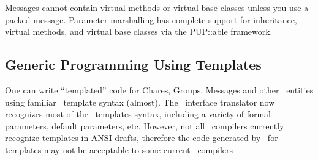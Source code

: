 Messages cannot contain virtual methods
or virtual base classes unless you use a packed message.
Parameter marshalling has complete support for inheritance, virtual
methods, and virtual base classes via the PUP::able framework.




\subsection{Generic Programming Using Templates}


One can write ``templated'' code for Chares, Groups, Messages and other
\charmpp\  entities using familiar \CC\ template syntax (almost). The \charmpp\
interface translator now recognizes most of the \CC\ templates syntax,
including a variety of formal parameters, default parameters, etc. However, not
all \CC\ compilers currently recognize templates in ANSI drafts, therefore the
code generated by \charmpp\ for templates may not be acceptable to some current
\CC\ compilers

\newcommand{\longcompilerfootnote}{\footnote{ Most modern \CC\
    compilers belong to one of the two camps. One that supports
    Borland style template instantiation, and the other that supports
    AT\&T Cfront style template instantiation. In the first, code is
    generated for the source file where the instantiation is seen.
    GNU \CC\ falls in this category.  In the second, which template is
    to be instantiated, and where the templated code is seen is noted
    in a separate area (typically a local directory), and then just
    before linking all the template instantiations are
    generated. Solaris CC 5.0 belongs to this category. For templates
    to work for compilers in the first category such as for GNU \CC\
    all the templated code needs to be visible to the compiler at the
    point of instantiation, that is, while compiling the source file
    containing the template instantiation. For a variety of reasons,
    \charmpp\ interface translator cannot generate all the templated
    code in the declarations file {\tt *.decl.h}, which is included in
    the source file where templates are instantiated. Thus, for
    \charmpp\ generated templates to work for GNU \CC\ even parts of
    the definitions file {\tt *.def.h} should be included in the \CC\
    source file. }}

